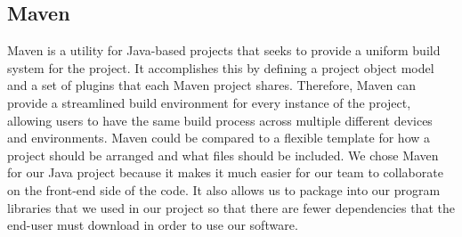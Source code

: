 
\subsection{Maven}
Maven is a utility for Java-based projects that seeks to provide a uniform build system for the project. It accomplishes this by defining a project object model and a set of plugins that each Maven project shares. Therefore, Maven can provide a streamlined build environment for every instance of the project, allowing users to have the same build process across multiple different devices and environments. Maven could be compared to a flexible template for how a project should be arranged and what files should be included. We chose Maven for our Java project because it makes it much easier for our team to collaborate on the front-end side of the code.  It also allows us to package into our program libraries that we used in our project so that there are fewer dependencies that the end-user must download in order to use our software.







